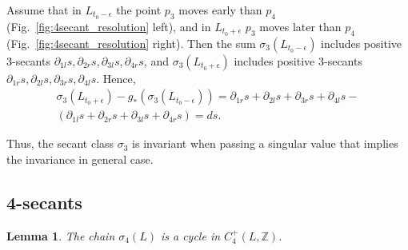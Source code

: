 \documentclass{article}
\newtheorem{lemma}{Lemma}
\theoremstyle{definition}
\theoremstyle{remark}
\def\Z{{\mathbb Z}}
\begin{document}
Assume that in $L_{t_0-\epsilon}$ the point $p_3$ moves early than $p_4$ (Fig.~\ref{fig:4secant_resolution} left), and in $L_{t_0+\epsilon}$ $p_3$ moves later than $p_4$ (Fig.~\ref{fig:4secant_resolution} right). Then the sum $\sigma_3(L_{t_0-\epsilon})$ includes positive $3$-secants $\partial_{1l}s, \partial_{2r}s, \partial_{3l}s, \partial_{4r}s$, and $\sigma_3(L_{t_0+\epsilon})$ includes positive $3$-secants $\partial_{1r}s, \partial_{2l}s, \partial_{3r}s, \partial_{4l}s$. Hence,
\begin{multline*}
    \sigma_3(L_{t_0+\epsilon})-g_*(\sigma_3(L_{t_0-\epsilon}))=\partial_{1r}s+ \partial_{2l}s+\partial_{3r}s+\partial_{4l}s-\\(\partial_{1l}s+\partial_{2r}s+\partial_{3l}s+\partial_{4r}s)=ds.
\end{multline*}

Thus, the secant class $\sigma_3$ is invariant when passing a singular value that implies the invariance in general case.

\subsection{4-secants}\label{subsect:4s_proof}

\begin{lemma}\label{lem:4secant_cocycle}
The chain $\sigma_4(L)$ is a cycle in $C^+_4(L,\Z)$.
\end{lemma}
\end{document}
